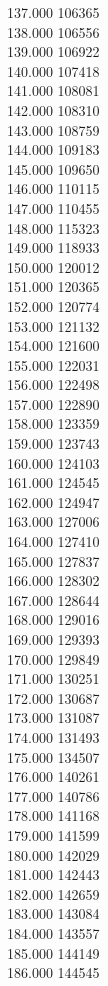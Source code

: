 { 137.000	106365 \\
 138.000	106556 \\
 139.000	106922 \\
 140.000	107418 \\
 141.000	108081 \\
 142.000	108310 \\
 143.000	108759 \\
 144.000	109183 \\
 145.000	109650 \\
 146.000	110115 \\
 147.000	110455 \\
 148.000	115323 \\
 149.000	118933 \\
 150.000	120012 \\
 151.000	120365 \\
 152.000	120774 \\
 153.000	121132 \\
 154.000	121600 \\
 155.000	122031 \\
 156.000	122498 \\
 157.000	122890 \\
 158.000	123359 \\
 159.000	123743 \\
 160.000	124103 \\
 161.000	124545 \\
 162.000	124947 \\
 163.000	127006 \\
 164.000	127410 \\
 165.000	127837 \\
 166.000	128302 \\
 167.000	128644 \\
 168.000	129016 \\
 169.000	129393 \\
 170.000	129849 \\
 171.000	130251 \\
 172.000	130687 \\
 173.000	131087 \\
 174.000	131493 \\
 175.000	134507 \\
 176.000	140261 \\
 177.000	140786 \\
 178.000	141168 \\
 179.000	141599 \\
 180.000	142029 \\
 181.000	142443 \\
 182.000	142659 \\
 183.000	143084 \\
 184.000	143557 \\
 185.000	144149 \\
 186.000	144545 \\
}
